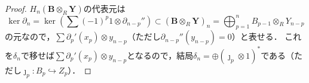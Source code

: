 \begin{proof}
  $H_n(\boldsymbol{B} \otimes_R \boldsymbol{Y})$の代表元は
  \[ \ker \partial_n = \ker \left(\sum (-1)^p 1 \otimes \partial_{n-p}''\right) \subset (\boldsymbol{B} \otimes_R \boldsymbol{Y})_n = \bigoplus_{p=1}^n B_{p-1} \otimes_R Y_{n-p} \]
  の元なので，$\sum \partial_p'(x_p) \otimes y_{n-p}$（ただし$\partial_{n-p}''(y_{n-p}) = 0$）と表せる．
  これを$\delta_n$で移せば$\sum \partial_p'(x_p) \otimes y_{n-p}$となるので，結局$\delta_n = \oplus (\jmath_p \otimes 1)^\ast$である（ただし$\jmath_p \colon B_p \hookrightarrow Z_p$）．
\end{proof}
